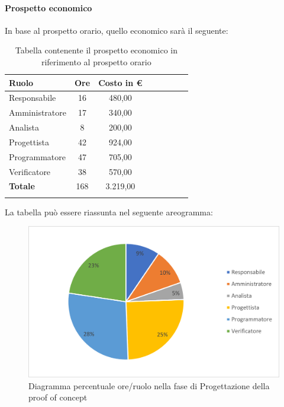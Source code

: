\paragraph{Prospetto economico}
In base al prospetto orario, quello economico sarà il seguente:

\begin{longtable}{|l|c|c|c|c|c|c|c|}
	\hline
	\rowcolor{lighter-grayer}
	\textbf{Ruolo}  & \textbf{Ore} & \textbf{Costo in €} \\
	\hline
	\endfirsthead

	\hline
	Responsabile    & 16           & 480,00              \\
	\hline
	\hline
	Amministratore  & 17           & 340,00              \\
	\hline
	\hline
	Analista        & 8            & 200,00              \\
	\hline
	\hline
	Progettista     & 42           & 924,00              \\
	\hline
	\hline
	Programmatore   & 47           & 705,00              \\
	\hline
	\hline
	Verificatore    & 38           & 570,00              \\
	\hline
	\hline
	\textbf{Totale} & 168          & 3.219,00            \\
	\hline
	\rowcolor{white}
	\caption{Tabella contenente il prospetto economico in riferimento al prospetto orario}
\end{longtable}
\pagebreak

La tabella può essere riassunta nel seguente areogramma:
\begin{figure}[H]
	\centering
	\includegraphics[width=0.8\linewidth]{res/images/preventivo/4-2.png}
	\caption{Diagramma percentuale ore/ruolo nella fase di Progettazione della proof of concept}
	\label{fig:diagramma costi ruolo fase progettazione della proof of concept}
\end{figure}

